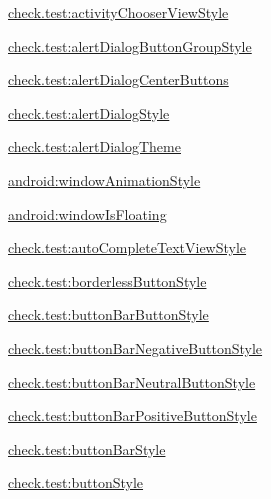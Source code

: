 {\ttfamily \hyperlink{classcheck_1_1test_1_1_r_1_1styleable_a5df6cc2d9245f0001ee13f7cb5b95869}{check.\+test\+:activity\+Chooser\+View\+Style}}

{\ttfamily \hyperlink{classcheck_1_1test_1_1_r_1_1styleable_acba96b3fbc00ef03937429054fbe3036}{check.\+test\+:alert\+Dialog\+Button\+Group\+Style}}

{\ttfamily \hyperlink{classcheck_1_1test_1_1_r_1_1styleable_a11c37dcf3c6bf471d394d417c9aaa633}{check.\+test\+:alert\+Dialog\+Center\+Buttons}}

{\ttfamily \hyperlink{classcheck_1_1test_1_1_r_1_1styleable_ab1ac7d03d2b00801128e1263f5826e5c}{check.\+test\+:alert\+Dialog\+Style}}

{\ttfamily \hyperlink{classcheck_1_1test_1_1_r_1_1styleable_ac9de00117911739b0431126a81b708d4}{check.\+test\+:alert\+Dialog\+Theme}}

{\ttfamily \hyperlink{classcheck_1_1test_1_1_r_1_1styleable_af787bd8d14167f831eaf83cd8fc2098e}{android\+:window\+Animation\+Style}}

{\ttfamily \hyperlink{classcheck_1_1test_1_1_r_1_1styleable_a08050f289331059420ffd439bcbc10e8}{android\+:window\+Is\+Floating}}

{\ttfamily \hyperlink{classcheck_1_1test_1_1_r_1_1styleable_a2e1e6f06dba491f9e8aa0916badaeee8}{check.\+test\+:auto\+Complete\+Text\+View\+Style}}

{\ttfamily \hyperlink{classcheck_1_1test_1_1_r_1_1styleable_a12279ad7c3b04030bd65962776fcef88}{check.\+test\+:borderless\+Button\+Style}}

{\ttfamily \hyperlink{classcheck_1_1test_1_1_r_1_1styleable_afeba9266742fb85f098bb860e221c453}{check.\+test\+:button\+Bar\+Button\+Style}}

{\ttfamily \hyperlink{classcheck_1_1test_1_1_r_1_1styleable_aaf6d54b7d21dd82c42f35041e1ce1c92}{check.\+test\+:button\+Bar\+Negative\+Button\+Style}}

{\ttfamily \hyperlink{classcheck_1_1test_1_1_r_1_1styleable_a18a041fde9f2407a8e18b1c7a357e426}{check.\+test\+:button\+Bar\+Neutral\+Button\+Style}}

{\ttfamily \hyperlink{classcheck_1_1test_1_1_r_1_1styleable_ac2ac7678c2fe6e4ec90fbff60457ded3}{check.\+test\+:button\+Bar\+Positive\+Button\+Style}}

{\ttfamily \hyperlink{classcheck_1_1test_1_1_r_1_1styleable_aef00ad24e719805177672c1be58ab494}{check.\+test\+:button\+Bar\+Style}}

{\ttfamily \hyperlink{classcheck_1_1test_1_1_r_1_1styleable_af32f3514cf5d1f07163a1a7b6adf5022}{check.\+test\+:button\+Style}}

